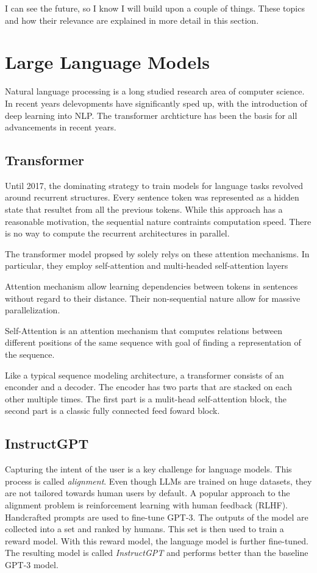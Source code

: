 \documentclass[english, version-2022-01]{uzl-thesis}
\begin{document}
I can see the future, so I know I will build upon a couple of things. These topics and how their relevance are explained in more detail in this section.

\section{Large Language Models}

Natural language processing is a long studied research area of computer science. In recent years delevopments have significantly sped up, with the introduction of deep learning into NLP. The transformer archticture has been the basis for all advancements in recent years.
\subsection{Transformer}
Until 2017, the dominating strategy to train models for language tasks revolved around recurrent structures. Every sentence token was represented as a hidden state that resultet from all the previous tokens. While this approach has a reasonable motivation, the sequential nature contraints computation speed. There is no way to compute the recurrent architectures in parallel.

The transformer model propsed by \cite{Vaswani2017} solely relys on these attention mechanisms. In particular, they employ self-attention and multi-headed self-attention layers

Attention mechanism allow learning dependencies between tokens in sentences without regard to their distance. Their non-sequential nature allow for massive parallelization.

Self-Attention is an attention mechanism that computes relations between different positions of the same sequence with goal of finding a representation of the sequence.

Like a typical sequence modeling architecture, a transformer consists of an enconder and a decoder. The encoder has two parts that are stacked on each other multiple times. The first part is a mulit-head self-attention block, the second part is a classic fully connected feed foward block.

\subsection{InstructGPT}

Capturing the intent of the user is a key challenge for language models. This process is called \textit{alignment}. Even though LLMs are trained on huge datasets, they are not tailored towards human users by default. A popular approach to the alignment problem is reinforcement learning with human feedback (RLHF). Handcrafted prompts are used to fine-tune GPT-3. The outputs of the model are collected into a set and ranked by humans. This set is then used to train a reward model. With this reward model, the language model is further fine-tuned. The resulting model is called \textit{InstructGPT} and performs better than the baseline GPT-3 model.
\end{document}

